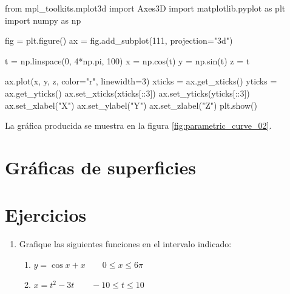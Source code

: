 \begin{python}
from mpl_toolkits.mplot3d import Axes3D
import matplotlib.pyplot as plt
import numpy as np

fig = plt.figure()
ax = fig.add_subplot(111, projection="3d")

t = np.linspace(0, 4*np.pi, 100)
x = np.cos(t)
y = np.sin(t)
z = t

ax.plot(x, y, z, color="r", linewidth=3)
xticks = ax.get_xticks()
yticks = ax.get_yticks()
ax.set_xticks(xticks[::3])
ax.set_yticks(yticks[::3])
ax.set_xlabel("X")
ax.set_ylabel("Y")
ax.set_zlabel("Z")
plt.show()
\end{python}

La gráfica producida se muestra en la figura \ref{fig:parametric_curve_02}.


\section{Gráficas de superficies}


\section{Ejercicios}

\begin{enumerate}
\item Grafique las siguientes funciones en el intervalo indicado:
\begin{enumerate}
\item $ y = \cos x + x \qquad 0 \leq x \leq 6\pi $ 
\item $ x = t^2 - 3t \qquad -10 \leq t \leq 10 $ 
\end{enumerate}

\end{enumerate}